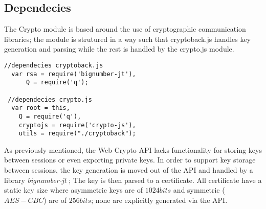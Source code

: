 \subsection{Dependecies}
The Crypto module is based around the use of cryptographic communication libraries; the module is strutured in a way such that cryptoback.js handles key generation and parsing while the rest is handled by the crypto.js module.
\begin{Code}
\begin{lstlisting}[caption={Included database operations}, label={lst:api}]
 //dependecies cryptoback.js
  var rsa = require('bignumber-jt'),
      Q = require('q');

 //dependecies crypto.js
  var root = this,
    Q = require('q'),
    cryptojs = require('crypto-js'),
    utils = require("./cryptoback");
\end{lstlisting}
\end{Code}
As previously mentioned, the Web Crypto API lacks functionality for storing keys between sessions or even exporting private keys. In order to support key storage between sessions, the key generation is moved out of the API and handled by a library \emph{bignumber-jt} \cite{Bignumber:Online}; The key is then parsed to a certificate.
All certificate have a static key size where asymmetric keys are of $1024bits$ and symmetric ($AES-CBC$) are of $256bits$; none are explicitly generated via the API.


